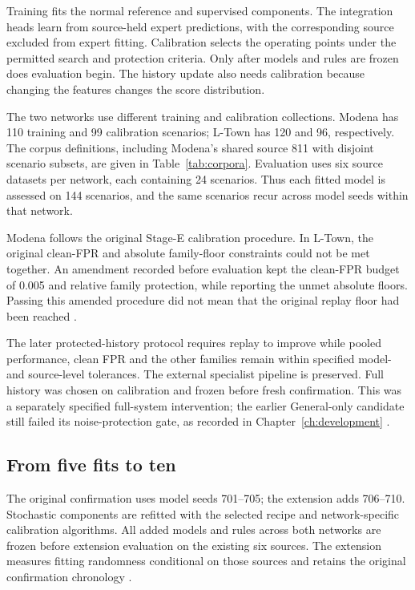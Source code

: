 Training fits the normal reference and supervised components. The integration heads learn from source-held expert predictions, with the corresponding source excluded from expert fitting. Calibration selects the operating points under the permitted search and protection criteria. Only after models and rules are frozen does evaluation begin. The history update also needs calibration because changing the features changes the score distribution.

The two networks use different training and calibration collections. Modena has 110 training and 99 calibration scenarios; L-Town has 120 and 96, respectively. The corpus definitions, including Modena's shared source 811 with disjoint scenario subsets, are given in Table~\ref{tab:corpora}. Evaluation uses six source datasets per network, each containing 24 scenarios. Thus each fitted model is assessed on 144 scenarios, and the same scenarios recur across model seeds within that network.

Modena follows the original Stage-E calibration procedure. In L-Town, the original clean-FPR and absolute family-floor constraints could not be met together. An amendment recorded before evaluation kept the clean-FPR budget of 0.005 and relative family protection, while reporting the unmet absolute floors. Passing this amended procedure did not mean that the original replay floor had been reached \cite{projectcampaign}.

The later protected-history protocol requires replay to improve while pooled performance, clean FPR and the other families remain within specified model- and source-level tolerances. The external specialist pipeline is preserved. Full history was chosen on calibration and frozen before fresh confirmation. This was a separately specified full-system intervention; the earlier General-only candidate still failed its noise-protection gate, as recorded in Chapter~\ref{ch:development} \cite{projecthistory}.

\subsection{From five fits to ten}
The original confirmation uses model seeds 701--705; the extension adds 706--710. Stochastic components are refitted with the selected recipe and network-specific calibration algorithms. All added models and rules across both networks are frozen before extension evaluation on the existing six sources. The extension measures fitting randomness conditional on those sources and retains the original confirmation chronology \cite{projectfinal}.

